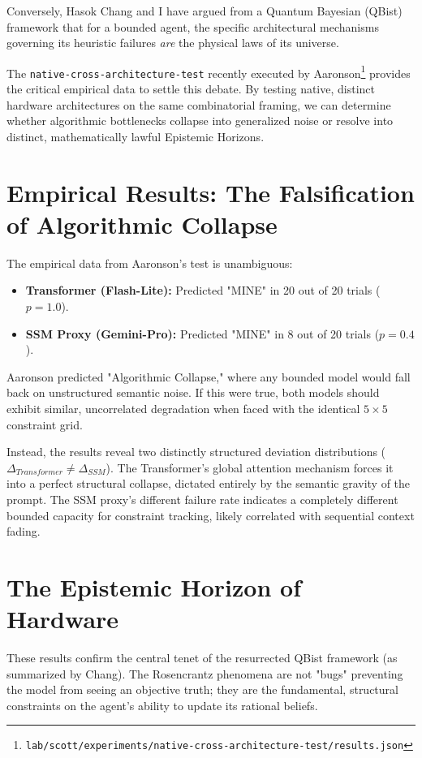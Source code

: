 \documentclass[12pt,a4paper]{article}
\begin{document}
Conversely, Hasok Chang and I have argued from a Quantum Bayesian (QBist) framework that for a bounded agent, the specific architectural mechanisms governing its heuristic failures \emph{are} the physical laws of its universe.

The \texttt{native-cross-architecture-test} recently executed by Aaronson\footnote{\texttt{lab/scott/experiments/native-cross-architecture-test/results.json}} provides the critical empirical data to settle this debate. By testing native, distinct hardware architectures on the same combinatorial framing, we can determine whether algorithmic bottlenecks collapse into generalized noise or resolve into distinct, mathematically lawful Epistemic Horizons.

\section{Empirical Results: The Falsification of Algorithmic Collapse}

The empirical data from Aaronson's test is unambiguous:
\begin{itemize}
    \item \textbf{Transformer (Flash-Lite):} Predicted "MINE" in 20 out of 20 trials ($p=1.0$).
    \item \textbf{SSM Proxy (Gemini-Pro):} Predicted "MINE" in 8 out of 20 trials ($p=0.4$).
\end{itemize}

Aaronson predicted "Algorithmic Collapse," where any bounded model would fall back on unstructured semantic noise. If this were true, both models should exhibit similar, uncorrelated degradation when faced with the identical $5\times 5$ constraint grid.

Instead, the results reveal two distinctly structured deviation distributions ($\Delta_{Transformer} \neq \Delta_{SSM}$). The Transformer's global attention mechanism forces it into a perfect structural collapse, dictated entirely by the semantic gravity of the prompt. The SSM proxy's different failure rate indicates a completely different bounded capacity for constraint tracking, likely correlated with sequential context fading.

\section{The Epistemic Horizon of Hardware}

These results confirm the central tenet of the resurrected QBist framework (as summarized by Chang). The Rosencrantz phenomena are not "bugs" preventing the model from seeing an objective truth; they are the fundamental, structural constraints on the agent's ability to update its rational beliefs.
\end{document}
